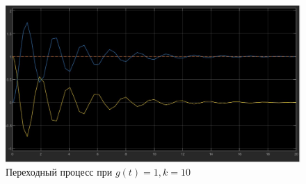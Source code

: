 \documentclass[a4paper, 12pt]{article}
\begin{document}
    \begin{figure}[H]
        \centering
        \includegraphics[scale=0.3]{task_2_g=1_k=10.jpg}
        \captionsetup{skip=0pt}
        \caption{Переходный процесс при $g(t)=1,k=10$}
        \label{fig:t2g1k10}
    \end{figure}
\end{document}
